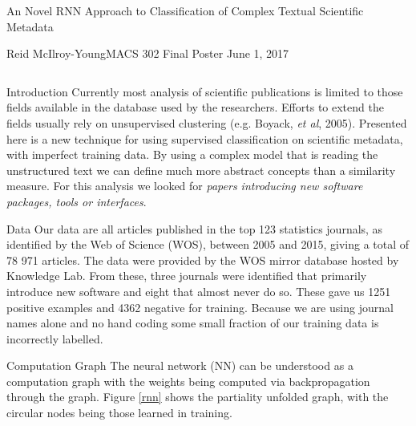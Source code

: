 \documentclass[final]{beamer}
\newlength{\sepwid}
\newlength{\onecolwid}
\begin{document}
	
\begin{frame}{}

\begin{block}{\centering \Huge {An Novel RNN Approach to Classification of Complex Textual Scientific Metadata}}
	\begin{center}
		\Large{
			Reid McIlroy-Young\quad MACS 302 Final Poster \quad June 1, 2017}
	\end{center}
\end{block}


\begin{columns}[t] 
	
	\begin{column}{\onecolwid} 

		\begin{alertblock}{Introduction}
			\justifying
			Currently most analysis of scientific publications is limited to those fields available in the database used by the researchers. Efforts to extend the fields usually rely on unsupervised clustering (e.g. Boyack, \textit{et al}, 2005). Presented here is a new technique for using supervised classification on scientific metadata, with imperfect training data. By using a complex model that is reading the unstructured text we can define much more abstract concepts than a similarity measure. For this analysis we looked for \textit{papers introducing new software packages, tools or interfaces}. 
		\end{alertblock}
		\begin{alertblock}{Data}
			\justifying
			Our data are all articles published in the top 123 statistics journals, as identified by the Web of Science (WOS), between 2005 and 2015, giving a total of 78 971 articles. The data were provided by the WOS mirror database hosted by Knowledge Lab. From these, three journals were identified that primarily introduce new software and eight that almost never do so. These gave us 1251 positive examples and 4362 negative for training. Because we are using journal names alone and no hand coding some small fraction of our training data is incorrectly labelled.
		\end{alertblock}

	
	\begin{alertblock}{Computation Graph}
		\justifying
		The neural network (NN) can be understood as a computation graph with the weights being computed via backpropagation through the graph. Figure \ref{rnn} shows the partiality unfolded graph, with the circular nodes being those learned in training. 
	\end{alertblock}
	\begin{block}{}
		\begin{figure}[!ht]
			\centering
			

\end{figure}
\end{block}
\end{column}
\end{columns}
\end{frame}
\end{document}
